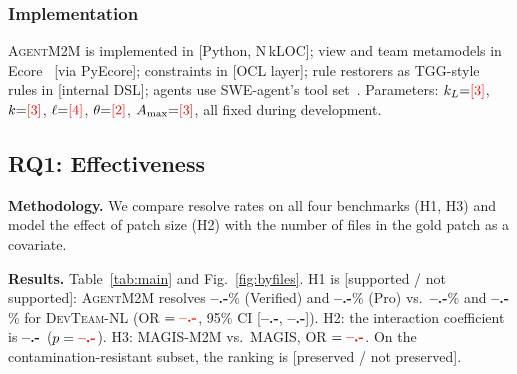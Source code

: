 \documentclass[10pt, anonymous, conference]{IEEEtran}
\theoremstyle{definition}
\theoremstyle{plain}
\theoremstyle{remark}
\newcommand{\tool}{\textsc{AgentM2M}}
\newcommand{\fixme}[1]{{\color{red}[#1]}}
\newcommand{\ph}{{\color{red}\textbf{--.-}}}     %
\newcommand{\hyp}[1]{{\color{blue}#1}}           %
\begin{document}
\subsubsection{Implementation}
\tool{} is implemented in \fixme{Python, N\,kLOC}; view and team metamodels in
Ecore~\cite{steinberg2008emf} \fixme{via PyEcore}; constraints in
\fixme{OCL layer}; rule restorers as TGG-style rules in \fixme{internal DSL};
agents use SWE-agent's tool set~\cite{yang2024sweagent}. Parameters:
$k_L{=}\fixme{3}$, $k{=}\fixme{3}$, $\ell{=}\fixme{4}$, $\theta{=}\fixme{2}$,
$A_{\max}{=}\fixme{3}$, all fixed during development.

\subsection{RQ1: Effectiveness}\label{subsec:rq1}

\noindent\textbf{Methodology.} We compare resolve rates on all four benchmarks
(H1, H3) and model the effect of patch size (H2) with the number of files in
the gold patch as a covariate.

\noindent\textbf{Results.} Table~\ref{tab:main} and Fig.~\ref{fig:byfiles}.
\hyp{H1 is [supported / not supported]: \tool{} resolves \ph\% (Verified) and
\ph\% (Pro) vs.\ \ph\% and \ph\% for \textsc{DevTeam-NL} (OR $=\ph$,
95\% CI [\ph, \ph]).} \hyp{H2: the interaction coefficient is \ph\
($p=\ph$).} \hyp{H3: \textsc{MAGIS-M2M} vs.\ MAGIS, OR $=\ph$.}
\hyp{On the contamination-resistant subset, the ranking is [preserved / not
preserved].}
\end{document}
